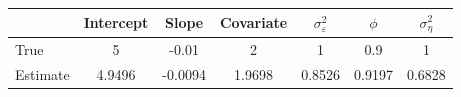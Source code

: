 \begin{tabular}{lcccccc}
\toprule
& Intercept & Slope & Covariate & $\sigma_\varepsilon^2$ & $\phi$ & $\sigma_\eta^2$ \\
\midrule
True & 5 & -0.01 & 2 & 1 & 0.9 & 1 \\
Estimate & 4.9496 & -0.0094 & 1.9698 & 0.8526 & 0.9197 & 0.6828 \\
\bottomrule
\end{tabular}
